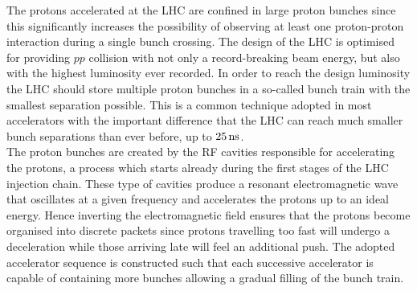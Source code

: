 The protons accelerated at the LHC are confined in large proton bunches since this significantly increases the possibility of observing at least one proton-proton interaction during a single bunch crossing. 
The design of the LHC is optimised for providing $pp$ collision with not only a record-breaking beam energy, but also with the highest luminosity ever recorded. In order to reach the design luminosity the LHC should store multiple proton bunches in a so-called bunch train with the smallest separation possible. 
This is a common technique adopted in most accelerators with the important difference that the LHC can reach much smaller bunch separations than ever before, up to $25 \, \mathrm{ns}$.
\\
The proton bunches are created by the RF cavities responsible for accelerating the protons, a process which starts already during the first stages of the LHC injection chain.
These type of cavities produce a resonant electromagnetic wave that oscillates at a given frequency and accelerates the protons up to an ideal energy.
Hence inverting the electromagnetic field ensures that the protons become organised into discrete packets since protons travelling too fast will undergo a deceleration while those arriving late will feel an additional push.
The adopted accelerator sequence is constructed such that each successive accelerator is capable of containing more bunches allowing a gradual filling of the bunch train.

